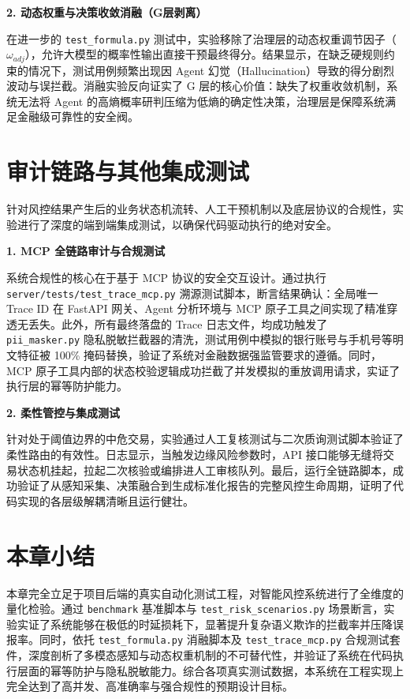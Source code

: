 \documentclass[twoside,openright]{xduugthesis}
\begin{document}
\textbf{2. 动态权重与决策收敛消融（G层剥离）}

在进一步的 \texttt{test\_formula.py} 测试中，实验移除了治理层的动态权重调节因子（$\omega_{adj}$），允许大模型的概率性输出直接干预最终得分。结果显示，在缺乏硬规则约束的情况下，测试用例频繁出现因 Agent 幻觉（Hallucination）导致的得分剧烈波动与误拦截。消融实验反向证实了 G 层的核心价值：缺失了权重收敛机制，系统无法将 Agent 的高熵概率研判压缩为低熵的确定性决策，治理层是保障系统满足金融级可靠性的安全阀。

\section{审计链路与其他集成测试}

针对风控结果产生后的业务状态机流转、人工干预机制以及底层协议的合规性，实验进行了深度的端到端集成测试，以确保代码驱动执行的绝对安全。

\textbf{1. MCP 全链路审计与合规测试}

系统合规性的核心在于基于 MCP 协议的安全交互设计。通过执行 \texttt{server/tests/test\_trace\_mcp.py} 溯源测试脚本，断言结果确认：全局唯一 Trace ID 在 FastAPI 网关、Agent 分析环境与 MCP 原子工具之间实现了精准穿透无丢失。此外，所有最终落盘的 Trace 日志文件，均成功触发了 \texttt{pii\_masker.py} 隐私脱敏拦截器的清洗，测试用例中模拟的银行账号与手机号等明文特征被 100\% 掩码替换，验证了系统对金融数据强监管要求的遵循。同时，MCP 原子工具内部的状态校验逻辑成功拦截了并发模拟的重放调用请求，实证了执行层的幂等防护能力。

\textbf{2. 柔性管控与集成测试}

针对处于阈值边界的中危交易，实验通过人工复核测试与二次质询测试脚本验证了柔性路由的有效性。日志显示，当触发边缘风险参数时，API 接口能够无缝将交易状态机挂起，拉起二次核验或编排进人工审核队列。最后，运行全链路脚本，成功验证了从感知采集、决策融合到生成标准化报告的完整风控生命周期，证明了代码实现的各层级解耦清晰且运行健壮。

\section{本章小结}

本章完全立足于项目后端的真实自动化测试工程，对智能风控系统进行了全维度的量化检验。通过 \texttt{benchmark} 基准脚本与 \texttt{test\_risk\_scenarios.py} 场景断言，实验实证了系统能够在极低的时延损耗下，显著提升复杂语义欺诈的拦截率并压降误报率。同时，依托 \texttt{test\_formula.py} 消融脚本及 \texttt{test\_trace\_mcp.py} 合规测试套件，深度剖析了多模态感知与动态权重机制的不可替代性，并验证了系统在代码执行层面的幂等防护与隐私脱敏能力。综合各项真实测试数据，本系统在工程实现上完全达到了高并发、高准确率与强合规性的预期设计目标。
\end{document}
